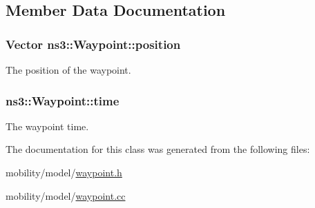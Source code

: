 \subsection{Member Data Documentation}
\subsubsection[{\texorpdfstring{position}{position}}]{\setlength{\rightskip}{0pt plus 5cm}Vector ns3\+::\+Waypoint\+::position}\hypertarget{classns3_1_1Waypoint_aad44d9729765083f4d100dc357b96fcd}{}\label{classns3_1_1Waypoint_aad44d9729765083f4d100dc357b96fcd}


The position of the waypoint. 

\subsubsection[{\texorpdfstring{time}{time}}]{ ns3\+::\+Waypoint\+::time}\hypertarget{classns3_1_1Waypoint_a41abef75280fb29826363ea4348675eb}{}\label{classns3_1_1Waypoint_a41abef75280fb29826363ea4348675eb}


The waypoint time. 



The documentation for this class was generated from the following files\+:\begin{DoxyCompactItemize}
\item 
mobility/model/\hyperlink{waypoint_8h}{waypoint.\+h}\item 
mobility/model/\hyperlink{waypoint_8cc}{waypoint.\+cc}\end{DoxyCompactItemize}
